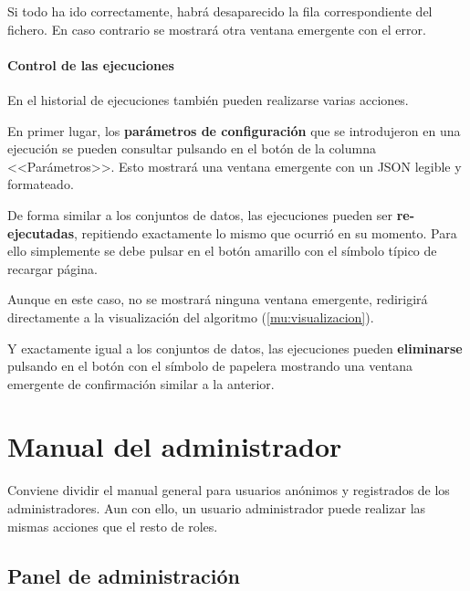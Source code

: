 
Si todo ha ido correctamente, habrá desaparecido la fila correspondiente del
fichero. En caso contrario se mostrará otra ventana emergente con el error.

\paragraph{Control de las ejecuciones} En el historial de ejecuciones también
pueden realizarse varias acciones.

\label{mu:parametrosrun}
En primer lugar, los \textbf{parámetros de configuración} que se introdujeron en
una ejecución se pueden consultar pulsando en el botón de la columna
<<Parámetros>>. Esto mostrará una ventana emergente con un JSON legible y
formateado.


De forma similar a los conjuntos de datos, las ejecuciones pueden ser
\textbf{re-ejecutadas}, repitiendo exactamente lo mismo que ocurrió en su momento. Para
ello simplemente se debe pulsar en el botón amarillo con el símbolo típico de
recargar página.

Aunque en este caso, no se mostrará ninguna ventana emergente, redirigirá
directamente a la visualización del algoritmo (\ref{mu:visualizacion}).

\label{mu:eliminarrun}
Y exactamente igual a los conjuntos de datos, las ejecuciones pueden \textbf{eliminarse}
pulsando en el botón con el símbolo de papelera mostrando una ventana emergente
de confirmación similar a la anterior.



\section{Manual del administrador}

Conviene dividir el manual general para usuarios anónimos y registrados de los
administradores. Aun con ello, un usuario administrador puede realizar las
mismas acciones que el resto de roles.

\subsection{Panel de administración}

